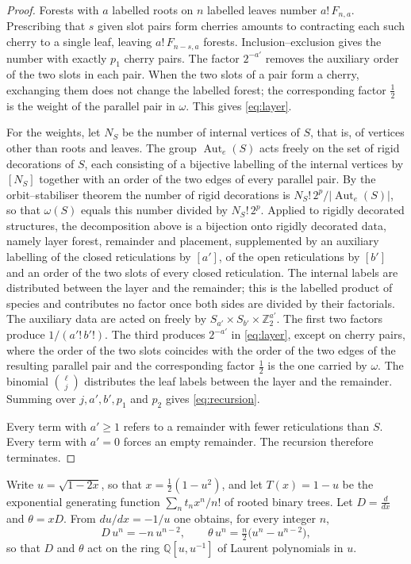 \documentclass[11pt,a4paper]{article}
\theoremstyle{definition}
\newcommand{\Aut}{\operatorname{Aut}}
\begin{document}
\begin{proof}
Forests with $a$ labelled roots on $n$ labelled leaves number $a!\,F_{n,a}$. Prescribing that $s$ given slot pairs form cherries amounts to contracting each such cherry to a single leaf, leaving $a!\,F_{n-s,a}$ forests. Inclusion–exclusion gives the number with exactly $p_1$ cherry pairs. The factor $2^{-a'}$ removes the auxiliary order of the two slots in each pair. When the two slots of a pair form a cherry, exchanging them does not change the labelled forest; the corresponding factor $\tfrac12$ is the weight of the parallel pair in $\omega$. This gives \eqref{eq:layer}.

For the weights, let $N_S$ be the number of internal vertices of $S$, that is, of vertices other than roots and leaves. The group $\Aut_e(S)$ acts freely on the set of rigid decorations of $S$, each consisting of a bijective labelling of the internal vertices by $[N_S]$ together with an order of the two edges of every parallel pair. By the orbit--stabiliser theorem the number of rigid decorations is $N_S!\,2^{p}/|\Aut_e(S)|$, so that $\omega(S)$ equals this number divided by $N_S!\,2^{p}$. Applied to rigidly decorated structures, the decomposition above is a bijection onto rigidly decorated data, namely layer forest, remainder and placement, supplemented by an auxiliary labelling of the closed reticulations by $[a']$, of the open reticulations by $[b']$ and an order of the two slots of every closed reticulation. The internal labels are distributed between the layer and the remainder; this is the labelled product of species and contributes no factor once both sides are divided by their factorials. The auxiliary data are acted on freely by $S_{a'}\times S_{b'}\times\mathbb{Z}_2^{a'}$. The first two factors produce $1/(a'!\,b'!)$. The third produces $2^{-a'}$ in \eqref{eq:layer}, except on cherry pairs, where the order of the two slots coincides with the order of the two edges of the resulting parallel pair and the corresponding factor $\tfrac12$ is the one carried by $\omega$. The binomial $\binom{\ell}{j}$ distributes the leaf labels between the layer and the remainder. Summing over $j,a',b',p_1$ and $p_2$ gives \eqref{eq:recursion}.

Every term with $a'\ge1$ refers to a remainder with fewer reticulations than $S$. Every term with $a'=0$ forces an empty remainder. The recursion therefore terminates.
\end{proof}

Write $u=\sqrt{1-2x}$, so that $x=\frac12(1-u^2)$, and let $T(x)=1-u$ be the exponential generating function $\sum_n t_nx^n/n!$ of rooted binary trees. Let $D=\frac{d}{dx}$ and $\theta=xD$. From $du/dx=-1/u$ one obtains, for every integer $n$,
\begin{equation}\label{eq:uops}
D\,u^n=-n\,u^{n-2},\qquad \theta\,u^n=\tfrac n2\bigl(u^n-u^{n-2}\bigr),
\end{equation}
so that $D$ and $\theta$ act on the ring $\mathbb{Q}[u,u^{-1}]$ of Laurent polynomials in $u$.
\end{document}
